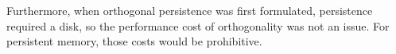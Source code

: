 Furthermore, when orthogonal persistence was first formulated, persistence
required a disk, so the performance cost of orthogonality was not an issue.
For persistent memory, those costs would be prohibitive.







